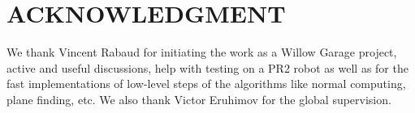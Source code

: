 \documentclass[letterpaper, 10 pt, conference]{ieeeconf}  %
\begin{document}
\addtolength{\textheight}{-12cm}   %



\section*{ACKNOWLEDGMENT}

We thank Vincent Rabaud for initiating the work as 
a Willow Garage project, active and useful discussions, help with 
testing on a PR2 robot as well as for the fast implementations 
of low-level steps of the algorithms like normal computing, plane finding, etc.
We also thank Victor Eruhimov for the global supervision.




\end{document}
